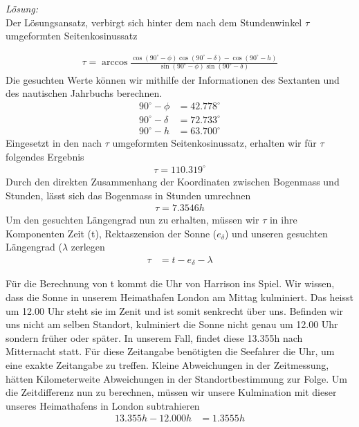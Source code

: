 \begin{refsection}
\textit{Lösung:} \\
Der Lösungsansatz, verbirgt sich hinter dem nach dem Stundenwinkel $\tau$ umgeformten Seitenkosinussatz

\begin{align*}
\tau = \arccos 
\frac{ \cos(90^{\circ} - \phi) \cos(90^{\circ} - \delta) - \cos(90^{\circ} - h)} {\sin(90^{\circ} - \phi)\sin(90^{\circ} - \delta)}
\end{align*}
Die gesuchten Werte können wir mithilfe der Informationen des Sextanten und des nautischen Jahrbuchs berechnen.
\begin{align*}
90^{\circ} - \phi &= 42.778^{\circ}
\\
90^{\circ} - \delta &= 72.733^{\circ}
\\
90^{\circ} - h &= 63.700^{\circ}
\end{align*}
Eingesetzt in den nach $\tau$ umgeformten Seitenkosinussatz, erhalten wir für $\tau$ folgendes Ergebnis
\begin{align*}
\tau = 110.319^{\circ} 
\end{align*}
Durch den direkten Zusammenhang der Koordinaten zwischen Bogenmass und Stunden, lässt sich das Bogenmass in Stunden umrechnen
\begin{align*}
\tau = 7.3546h
\end{align*}
Um den gesuchten Längengrad nun zu erhalten, müssen wir $\tau$ in ihre Komponenten Zeit (t), Rektaszension der Sonne ($e_\delta$) und unseren gesuchten Längengrad ($\lambda$ zerlegen
\begin{align*}
\tau &= t - e_\delta - \lambda 
\end{align*}


Für die Berechnung von t kommt die Uhr von Harrison ins Spiel. Wir wissen, dass die Sonne in unserem Heimathafen London am Mittag kulminiert. Das heisst um 12.00 Uhr steht sie im Zenit und ist somit senkrecht über uns. 
Befinden wir uns nicht am selben Standort, kulminiert die Sonne nicht genau um 12.00 Uhr sondern früher oder später.
In unserem Fall, findet diese 13.355h nach Mitternacht statt. Für diese Zeitangabe benötigten die Seefahrer die Uhr, um eine exakte Zeitangabe zu treffen. Kleine Abweichungen in der Zeitmessung, hätten Kilometerweite Abweichungen in der Standortbestimmung zur Folge.
Um die Zeitdifferenz nun zu berechnen, müssen wir unsere Kulmination mit dieser unseres Heimathafens in London subtrahieren 
\begin{align*}
13.355h - 12.000h &= 1.3555h
\end{align*}


\end{refsection}

